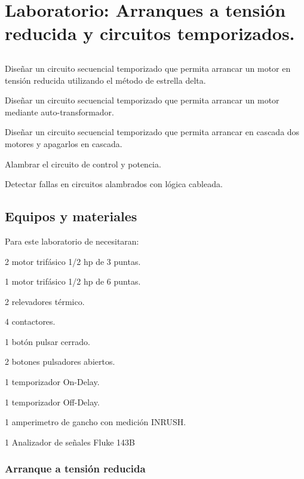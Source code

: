 \chapter{Laboratorio:  Arranques a tensión reducida y circuitos temporizados.}

\section{\obj}
\capacidad
\begin{itemize}
	{\small
	 \item Diseñar un circuito secuencial temporizado que permita arrancar un motor en tensión reducida utilizando el método de estrella delta.
    \item  Diseñar un circuito secuencial temporizado que permita arrancar un motor mediante auto-transformador.
    \item  Diseñar un circuito secuencial temporizado que permita arrancar en cascada dos motores y apagarlos en cascada. 
	 \item Alambrar el circuito de control y potencia.
	 \item Detectar fallas en circuitos alambrados con lógica cableada.
	 
 }
\end{itemize} 

 
\section{Equipos y materiales}
Para este laboratorio de necesitaran:
\begin{itemize}
	{\small \item 2 motor trifásico 1/2 hp de 3 puntas.
	\item 1 motor trifásico 1/2 hp de 6 puntas.
	\item 2 relevadores térmico.
	\item 4 contactores.
	\item 1 botón pulsar cerrado.
	\item 2 botones pulsadores abiertos.
	\item 1 temporizador On-Delay.
	\item 1 temporizador Off-Delay.
	\item 1 amperimetro de gancho con medición INRUSH.
	\item 1 Analizador de señales Fluke 143B
}
\end{itemize}

\subsection{Arranque a tensión reducida}

